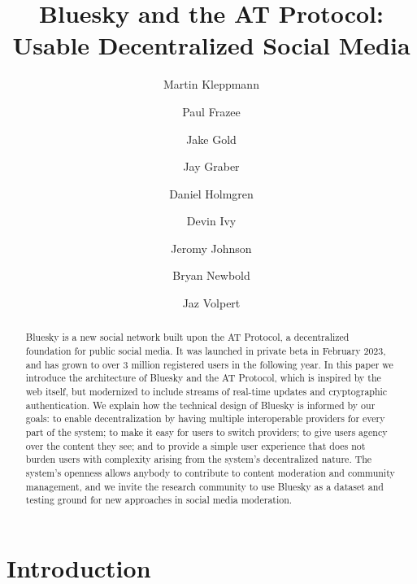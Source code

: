 \documentclass[sigconf,nonacm]{acmart}
\begin{document}
\title{Bluesky and the AT Protocol: Usable Decentralized Social Media}
\author{Martin Kleppmann}

\author{Paul Frazee} %
\author{Jake Gold} %
\author{Jay Graber} %
\author{Daniel Holmgren} %
\author{Devin Ivy} %
\author{Jeromy Johnson} %
\author{Bryan Newbold} %
\author{Jaz Volpert} %

\begin{abstract}
    Bluesky is a new social network built upon the AT Protocol, a decentralized foundation for public social media.
    It was launched in private beta in February 2023, and has grown to over 3 million registered users in the following year.
    In this paper we introduce the architecture of Bluesky and the AT Protocol, which is inspired by the web itself, but modernized to include streams of real-time updates and cryptographic authentication.
    We explain how the technical design of Bluesky is informed by our goals: to enable decentralization by having multiple interoperable providers for every part of the system; to make it easy for users to switch providers; to give users agency over the content they see; and to provide a simple user experience that does not burden users with complexity arising from the system's decentralized nature.
    The system's openness allows anybody to contribute to content moderation and community management, and we invite the research community to use Bluesky as a dataset and testing ground for new approaches in social media moderation.
\end{abstract}

\maketitle
\pagestyle{plain} %

\section{Introduction}\label{sec:introduction}
\end{document}
